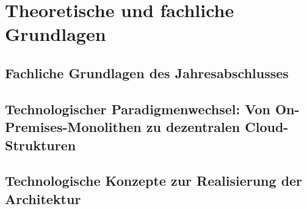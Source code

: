 \chapter{Theoretische und fachliche Grundlagen}

\section{Fachliche Grundlagen des Jahresabschlusses}

\section{Technologischer Paradigmenwechsel: Von On-Premises-Monolithen zu dezentralen Cloud-Strukturen}

\section{Technologische Konzepte zur Realisierung der Architektur}

